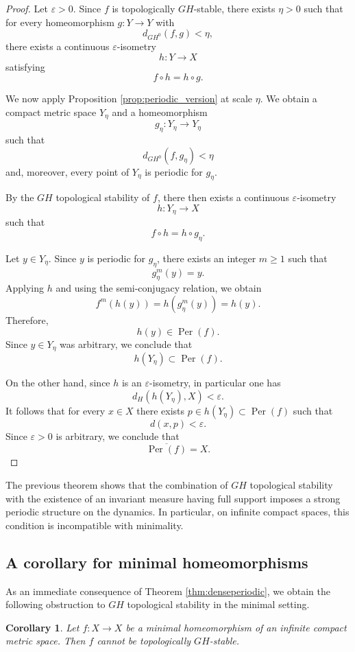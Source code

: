 \documentclass{amsart}
\numberwithin{equation}{section}
\newtheorem{corollary}[theorem]{Corollary}
\theoremstyle{remark}
\DeclareMathOperator{\Per}{Per}
\begin{document}
\begin{proof}
Let $\varepsilon>0$. Since $f$ is topologically $GH$-stable, there exists $\eta>0$ such that for every homeomorphism $g:Y\to Y$ with
\[
d_{GH^0}(f,g)<\eta,
\]
there exists a continuous $\varepsilon$-isometry
\[
h:Y\to X
\]
satisfying
\[
f\circ h=h\circ g.
\]

We now apply Proposition \ref{prop:periodic_version} at scale $\eta$. We obtain a compact metric space $Y_\eta$ and a homeomorphism
\[
g_\eta:Y_\eta\to Y_\eta
\]
such that
\[
d_{GH^0}(f,g_\eta)<\eta
\]
and, moreover, every point of $Y_\eta$ is periodic for $g_\eta$.

By the $GH$ topological stability of $f$, there then exists a continuous $\varepsilon$-isometry
\[
h:Y_\eta\to X
\]
such that
\[
f\circ h=h\circ g_\eta.
\]

Let $y\in Y_\eta$. Since $y$ is periodic for $g_\eta$, there exists an integer $m\ge 1$ such that
\[
g_\eta^m(y)=y.
\]
Applying $h$ and using the semi-conjugacy relation, we obtain
\[
f^m(h(y))
=
h(g_\eta^m(y))
=
h(y).
\]
Therefore,
\[
h(y)\in \Per(f).
\]
Since $y\in Y_\eta$ was arbitrary, we conclude that
\[
h(Y_\eta)\subset \Per(f).
\]

On the other hand, since $h$ is an $\varepsilon$-isometry, in particular one has
\[
d_H(h(Y_\eta),X)<\varepsilon.
\]
It follows that for every $x\in X$ there exists $p\in h(Y_\eta)\subset \Per(f)$ such that
\[
d(x,p)<\varepsilon.
\]
Since $\varepsilon>0$ is arbitrary, we conclude that
\[
\overline{\Per(f)}=X.
\]
\end{proof}

The previous theorem shows that the combination of $GH$ topological stability with the existence of an invariant measure having full support imposes a strong periodic structure on the dynamics. In particular, on infinite compact spaces, this condition is incompatible with minimality.

\subsection{A corollary for minimal homeomorphisms}

As an immediate consequence of Theorem \ref{thm:denseperiodic}, we obtain the following obstruction to $GH$ topological stability in the minimal setting.

\begin{corollary}\label{cor:minimal_not_GHstable}
Let $f:X\to X$ be a minimal homeomorphism of an infinite compact metric space. Then $f$ cannot be topologically $GH$-stable.
\end{corollary}
\end{document}
